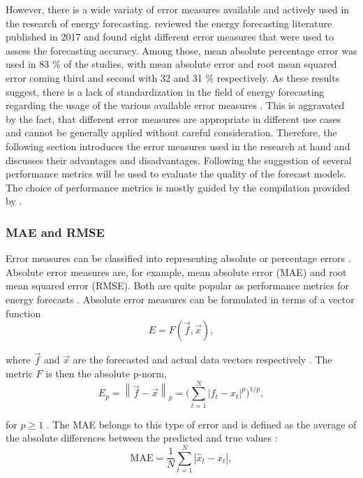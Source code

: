 However, there is a wide variaty of error measures available and actively used in the research of energy forecasting. \citet{zor:2017} reviewed the energy forecasting literature published in 2017 and found eight different error measures that were used to assess the forecasting accuracy. Among those, mean absolute percentage error was used in 83 \% of the studies, with mean absolute error and root mean squared error coming third and second with 32 and 31 \% respectively. As these results suggest, there is a lack of standardization in the field of energy forecasting regarding the usage of the various available error measures \citep{Meer:2018}. This is aggravated by the fact, that different error measures are appropriate in different use cases and cannot be generally applied without careful consideration. Therefore, the following section introduces the error measures used in the research at hand and discusses their advantages and disadvantages. Following the suggestion of \citet{Hoff:2013} several performance metrics will be used to evaluate the quality of the forecast models. The choice of performance metrics is mostly guided by the compilation provided by \citet{Meer:2018}.


\subsubsection{MAE and RMSE}

Error measures can be classified into representing absolute or percentage errors \citep{Hoff:2013}. Absolute error measures are, for example, mean absolute error (MAE) and root mean squared error (RMSE). Both are quite popular as performance metrics for energy forecasts \citep{zor:2017}. Absolute error measures can be formulated in terms of a vector function 
%
\begin{equation} \label{Eq:vectorfunction}
    E=F\left(\vec{f}, \vec{x}\right),
\end{equation}

\noindent where $\vec{f}$ and $\vec{x}$ are the forecasted and actual data vectors respectively \citep{Haben:2014}. The metric $F$ is then the absolute p-norm,
%
\begin{equation} \label{Eq:pnorm}
    E_p=\left\lVert\vec{f}-\vec{x}\right\rVert_p=\biggl(\sum_{t=1}^N \left|f_t-x_t\right|^p\biggr)^{1/p},
\end{equation}

\noindent for $p\geq1$ \citep[][p. 52]{golub:2012}. The MAE belongs to this type of error and is defined as the average of the absolute differences between the predicted and true values \citep{Hoff:2013}:
%
\begin{equation} \label{Eq:MAE}
\text{MAE}=\frac{1}{N}\sum_{t=1}^N\left|\widehat{x}_t-x_t\right|,    
\end{equation}


